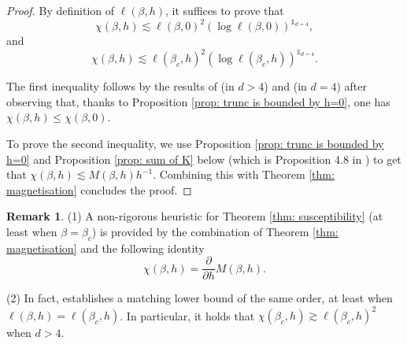 \documentclass[11pt,a4paper]{article}
\numberwithin{equation}{section}
\theoremstyle{plain}
\theoremstyle{definition}
\newtheorem{Rem}[Thm]{Remark}
\begin{document}
\begin{proof} By definition of $\ell(\beta,h)$, it suffices to prove that 
\begin{equation}
\chi(\beta,h)\lesssim \ell(\beta,0)^2(\log \ell(\beta,0))^{\mathds{1}_{d=4}},
\end{equation} and 
\begin{equation}
\chi(\beta,h)\lesssim \ell(\beta_c,h)^2(\log \ell(\beta_c,h))^{\mathds{1}_{d=4}}.
\end{equation} 

The first inequality follows by the results of \cite{AizenmanGeometricAnalysis1982} (in $d>4$) and \cite{AizenmanGrahamRenormalizedCouplingSusceptibility4d1983} (in $d=4$) after observing that, thanks to Proposition \ref{prop: trunc is bounded by h=0}, one has $\chi(\beta,h)\leq \chi(\beta,0)$. 

To prove the second inequality, we use Proposition \ref{prop: trunc is bounded by h=0} and Proposition \ref{prop: sum of K} below (which is Proposition 4.8 in \cite{AizenmanFernandezCriticalBehaviorMagnetization1986}) to get that $\chi(\beta,h)\lesssim M(\beta,h) h^{-1}$. Combining this with Theorem \ref{thm: magnetisation} concludes the proof. 
%
%
%	
\end{proof}


\begin{Rem}\label{rem:suscept lb}\hspace{-1pt}(1) A non-rigorous heuristic for Theorem \ref{thm: susceptibility} (at least when $\beta=\beta_c$) is provided by the combination of Theorem \ref{thm: magnetisation} and the following identity
\begin{equation}
	\chi(\beta,h)=\frac{\partial}{\partial h}M(\beta,h).
\end{equation}

(2) In fact, \cite{AizenmanFernandezCriticalBehaviorMagnetization1986} 
establishes a matching lower bound of the same order, at least when 
$\ell(\beta,h)=\ell(\beta_c,h)$. In particular, it holds that $\chi(\beta_c,h)\gtrsim \ell(\beta_c,h)^2$ when $d>4$.
\end{Rem}
\end{document}
